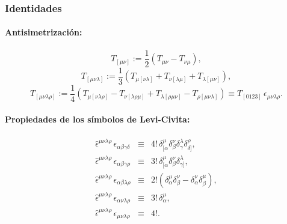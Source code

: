 \subsubsection{Identidades}

\paragraph{Antisimetrización:}

\begin{equation}
T_{[\mu\nu]}:=\frac{1}{2}(T_{\mu\nu}-T_{\nu\mu}),
\end{equation}
\begin{equation}
T_{[\mu\nu\lambda]}:=\frac{1}{3}(T_{\mu[\nu\lambda]}+T_{\nu[\lambda\mu]}+T_{
\lambda[\mu\nu]}),
\end{equation}
\begin{equation}
T_{[\mu\nu\lambda\rho]}:=\frac{1}{4}(T_{\mu[\nu\lambda\rho]}-T_{\nu[
\lambda\rho\mu]}+T_{\lambda[\rho\mu\nu]}-T_{\rho[\mu\nu\lambda]})\equiv T_{[0123]}\,\epsilon_{\mu\nu\lambda\rho}.
\end{equation}

\paragraph{Propiedades de los símbolos de Levi-Civita:}
\begin{eqnarray}
\hat\epsilon^{\mu\nu\lambda\rho}\, \epsilon_{\alpha\beta\gamma\delta}
&\equiv& 4!\,\delta^\mu_{[\alpha}\delta ^\nu_\beta \delta^\lambda_\gamma
\delta^\rho_{\delta]}, \\
\hat\epsilon^{\mu\nu\lambda\rho}\, \epsilon_{\alpha\beta\gamma\rho}
&\equiv& 3!\,\delta^\mu_{[\alpha}\delta ^\nu_\beta \delta^\lambda_{\gamma]}, \\
\hat\epsilon^{\mu\nu\lambda\rho}\, \epsilon_{\alpha\beta\lambda\rho}
&\equiv& 2! \left(\delta^\mu_\alpha\delta ^\nu_\beta -  \delta^\nu_\alpha \delta^\mu_\beta \right),\\
\hat\epsilon^{\mu\nu\lambda\rho}\, \epsilon_{\alpha\nu\lambda\rho}
&\equiv& 3!\,\delta^\mu_\alpha,\\
\hat\epsilon^{\mu\nu\lambda\rho}\, \epsilon_{\mu\nu\lambda\rho}&\equiv& 4!.
\end{eqnarray}


